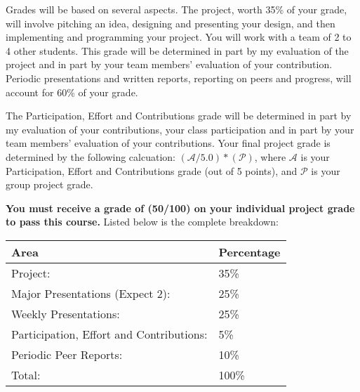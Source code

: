 Grades will be based on several aspects. The project, worth 35\% of your grade, will involve pitching an idea, designing and presenting your design, and then implementing and programming your project.
You will work with a team of 2 to 4 other students.
This grade will be determined in part by my evaluation of the project and in part by your team members' evaluation of your contribution.
Periodic presentations and written reports, reporting on peers and progress, will account for 60\% of your grade.

The Participation, Effort and Contributions grade will be determined in part by my evaluation of your contributions, your class participation and in part by your team members’ evaluation of your contributions.
Your final project grade is determined by the following calcuation: $(\mathcal{A}/5.0) * (\mathcal{P})$, where $\mathcal{A}$ is your Participation, Effort and Contributions grade (out of 5 points),
and $\mathcal{P}$ is your group project grade.

\textbf{You must receive a grade of (50/100) on your individual project grade to pass this course.}
Listed below is the complete breakdown:
\par\vspace{1cm}
\begin{tabular}{ @{}ll@{} }
    \toprule
        Area & Percentage \\
    \midrule
        Project: & 35\% \\
        Major Presentations (Expect 2): & 25\% \\
        Weekly Presentations: & 25\% \\
        Participation, Effort and Contributions: & 5\% \\
        Periodic Peer Reports: & 10\% \\
        Total: & 100\% \\
    \bottomrule
\end{tabular}